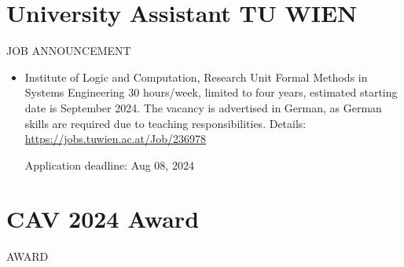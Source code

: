 \documentclass[prodmode,acmtecs]{acmsmall} %
\begin{document}
\begin{itemize}
\end{itemize}\section{University Assistant TU WIEN}\label{UniversityAssistantTUWIEN}JOB ANNOUNCEMENT 

\begin{itemize}\item  Institute of Logic and Computation, Research Unit Formal Methods in Systems Engineering 30 hours/week, limited to four years, estimated starting date is September 2024. The vacancy is advertised in German, as German skills are required due to teaching responsibilities. Details: \href{https://jobs.tuwien.ac.at/Job/236978}{https://jobs.tuwien.ac.at/Job/236978} 
 
Application deadline: Aug 08, 2024 
 
\end{itemize}\section{CAV 2024 Award}\label{CAV2024Award}AWARD 
\end{document}
